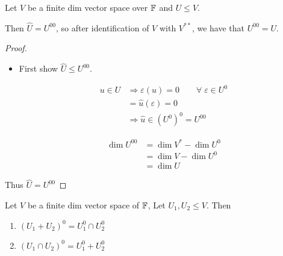 \documentclass[a4paper]{article}
\begin{document}
\begin{lemma} 
	Let $ V $ be a finite dim vector space over $ \mathbb{F} $ and $ U \leq V $.
	
	Then $ \hat{U} = U^{00} $, so after identification of $ V $ with $ V^{**} $, we have that $ U^{00} = U$.  
\end{lemma}

\begin{proof}
	\begin{itemize}
		\item First show $ \hat{U} \leq U^{00} $.
		
		\begin{align*}
		u \in U & \Rightarrow \varepsilon(u) = 0 \qquad \forall \; \varepsilon \in U^{0} \\
		& = \hat{u}(\varepsilon) = 0 \\
		& \Rightarrow \hat{u} \in (U^{0})^{0} = U^{00}
		\end{align*}
		
		
		\begin{align*}
		\dim U^{00}& = \dim V^{*} - \dim U^{0} \\
		& = \dim V - \dim U^{0} \\
		& = \dim U
		\end{align*}
	\end{itemize}

Thus $ \hat{U} = U^{00} $

\end{proof}

\begin{lemma} 
	Let $ V $ be a finite dim vector space of $ \mathbb{F} $, Let $ U_{1},U_{2} \leq V $. Then
	
	
	\begin{enumerate}
		\item $ (U_{1} + U_{2})^{0} = U_{1}^{0} \cap U_{2}^{0} $
		\item $ (U_{1} \cap U_{2})^{0} = U_{1}^{0} + U_{2}^{0} $
		
	\end{enumerate}
\end{lemma}
\end{document}

